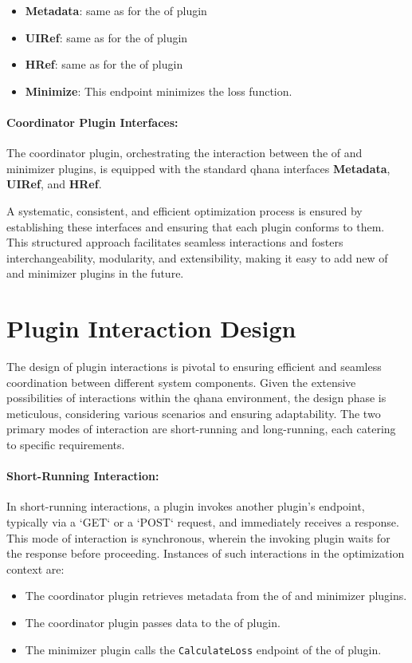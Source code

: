 \documentclass[
  a4paper,  %
  twoside,  %
  bibliography=totoc,
  headsepline,
  cleardoublepage=empty,
  parskip=half,
  draft=false
]{scrbook}
\begin{document}
\begin{itemize}
  \item \textbf{Metadata}: same as for the \gls{of} plugin
  \item \textbf{UIRef}: same as for the \gls{of} plugin
  \item \textbf{HRef}: same as for the \gls{of} plugin
  \item \textbf{Minimize}: This endpoint minimizes the loss function.
\end{itemize}

\paragraph{Coordinator Plugin Interfaces:}

The coordinator plugin, orchestrating the interaction between the \gls{of} and minimizer plugins, is equipped with the standard \gls{qhana} interfaces \textbf{Metadata}, \textbf{UIRef}, and \textbf{HRef}.

A systematic, consistent, and efficient optimization process is ensured by establishing these interfaces and ensuring that each plugin conforms to them.
This structured approach facilitates seamless interactions and fosters interchangeability, modularity, and extensibility, making it easy to add new \gls{of} and minimizer plugins in the future.

\section{Plugin Interaction Design}

The design of plugin interactions is pivotal to ensuring efficient and seamless coordination between different system components.
Given the extensive possibilities of interactions within the \gls{qhana} environment, the design phase is meticulous, considering various scenarios and ensuring adaptability.
The two primary modes of interaction are short-running and long-running, each catering to specific requirements.

\paragraph{Short-Running Interaction:}

In short-running interactions, a plugin invokes another plugin's endpoint, typically via a `GET` or a `POST` request, and immediately receives a response.
This mode of interaction is synchronous, wherein the invoking plugin waits for the response before proceeding.
Instances of such interactions in the optimization context are:
\begin{itemize}
    \item The coordinator plugin retrieves metadata from the \gls{of} and minimizer plugins.
    \item The coordinator plugin passes data to the \gls{of} plugin.
    \item The minimizer plugin calls the \texttt{CalculateLoss} endpoint of the \gls{of} plugin.
\end{itemize}
\end{document}
